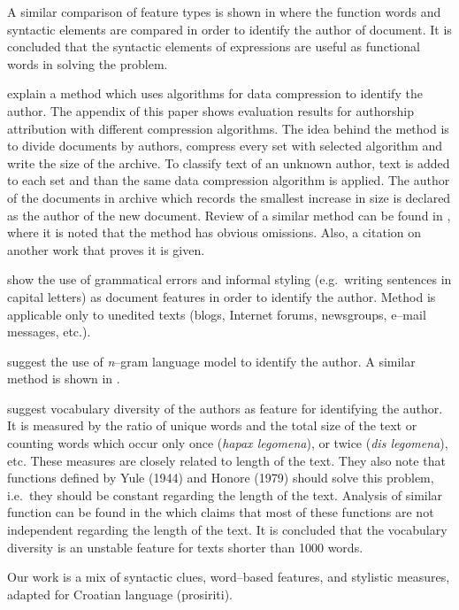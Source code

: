 \documentclass[11pt,english]{article}
\begin{document}
\begin{multicols}{2}
A similar comparison of feature types is shown in
\citep{uzuner2005comparative} where the function words and syntactic
elements are compared in order to identify the author of document. It is
concluded that the syntactic elements of expressions are useful as functional words in solving the
problem.

\citet{kukushkina2001using} explain a method which uses algorithms for data
compression to identify the author. The appendix of this paper shows evaluation results
for authorship attribution with different compression algorithms. The idea behind
the method is to divide documents by authors, compress every set with selected
algorithm and write the size of the archive. To classify text of an unknown author,
text is added to each set and than the same data compression algorithm is applied. The author of
the documents in archive which records the smallest increase in size is declared
as the author of the new document. Review of a similar method can be found in  \citep{zhao2005effective}, where it is noted that the method has obvious
omissions. Also, a citation on another work that proves it is given.

\citet{koppel2003exploiting} show the use of grammatical errors and informal
styling (e.g.\ writing sentences in capital letters) as document features in
order to identify the author. Method is applicable only to unedited texts (blogs,
Internet forums, newsgroups, e--mail messages, etc.).

\citet{peng2003language} suggest the use of \emph{n}--gram language model to identify
the author. A similar method is shown in \citep{coyotl2006authorship}.

\citet{stamatatos2001computer} suggest vocabulary diversity of the authors as
feature for identifying the author. It is measured by the ratio of unique words
and the total size of the text or counting words which occur only once
(\emph{hapax legomena}), or twice (\emph{dis legomena}), etc.
These measures are closely related to length of the text. They also note that
functions defined by Yule (1944) and Honore (1979) should solve this problem,
i.e.\ they should be constant regarding the length of the text. Analysis of
similar function can be found in the \citep{tweedie1998variable} which claims
that most of these functions are not independent regarding the length of the
text. It is concluded that the vocabulary diversity is an unstable feature for
texts shorter than 1000 words.

Our work is a mix of syntactic clues, word--based features, and stylistic measures, adapted for Croatian language (prosiriti).


\end{multicols}
\end{document}
